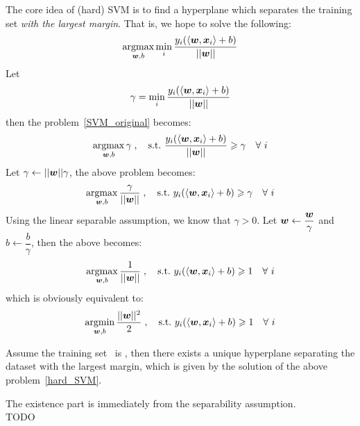 The core idea of (hard) SVM is to find a hyperplane which separates the training set
\textit{with the largest margin}. That is, we hope to solve the following:
\begin{equation}\label{SVM_original}
    \operatorname*{argmax}_{\boldsymbol{w}, b}\min_i \frac{y_i(\langle\boldsymbol{w}, \boldsymbol{x}_i\rangle + b)}{||\boldsymbol{w}||}
\end{equation}
Let
$$\gamma =\min_i \frac{y_i(\langle\boldsymbol{w}, \boldsymbol{x}_i\rangle + b)}{||\boldsymbol{w}||}$$
then the problem~\eqref{SVM_original} becomes:
\begin{equation}
    \operatorname*{argmax}_{\boldsymbol{w}, b} \gamma\;,\quad \text{s.t.\ } \frac{y_i(\langle\boldsymbol{w}, \boldsymbol{x}_i\rangle + b)}{||\boldsymbol{w}||} \geqslant
    \gamma \quad\forall\ i
\end{equation}
Let $\gamma \gets ||\boldsymbol{w}||\gamma$, the above problem becomes:
\begin{equation}
    \operatorname*{argmax}_{\boldsymbol{w}, b} \frac{\gamma}{||\boldsymbol{w}||}\;,\quad \text{s.t.\ } y_i(\langle\boldsymbol{w}, \boldsymbol{x}_i\rangle + b) \geqslant
    \gamma \quad\forall\ i
\end{equation}
Using the linear separable assumption, we know that $\gamma > 0$. Let $\boldsymbol{w} \gets \dfrac{\boldsymbol{w}}{\gamma}$
and $b \gets \dfrac{b}{\gamma}$, then the above becomes:
\begin{equation}\label{SVM_argmax}
    \operatorname*{argmax}_{\boldsymbol{w}, b} \frac{1}{||\boldsymbol{w}||}\;,\quad \text{s.t.\ } y_i(\langle\boldsymbol{w}, \boldsymbol{x}_i\rangle + b) \geqslant 1
    \quad\forall\ i
\end{equation}
which is obviously equivalent to:
\begin{equation}\label{hard_SVM}
    \operatorname*{argmin}_{\boldsymbol{w}, b} \frac{||\boldsymbol{w}||^2}{2}\;,\quad \text{s.t.\ } y_i(\langle\boldsymbol{w}, \boldsymbol{x}_i\rangle + b) \geqslant 1
    \quad\forall\ i
\end{equation}

\begin{thm}
    Assume the training set \dataset\ is , then there exists a unique hyperplane 
    separating the dataset with the largest margin, which is given by the solution of the above 
    problem~\eqref{hard_SVM}.
\end{thm}
\begin{pf}
    The existence part is immediately from the separability assumption.\\
    TODO
\end{pf}

